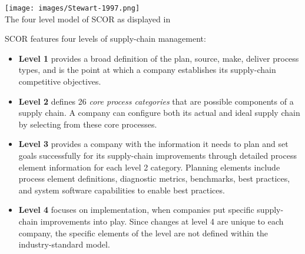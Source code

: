 \documentclass[11pt,a4paper]{article}
\begin{document}
\begin{center}
  \texttt{[image: images/Stewart-1997.png]}\\
  The four level model of SCOR as displayed in \cite{Stewart1997}
\end{center}

SCOR features four levels of supply-chain management:
\begin{itemize}
\item \textbf{Level 1} provides a broad definition of the plan, source, make,
  deliver process types, and is the point at which a company establishes its
  supply-chain competitive objectives.
\item \textbf{Level 2} defines 26 \emph{core process categories} that are
  possible components of a supply chain. A company can configure both its
  actual and ideal supply chain by selecting from these core processes.
\item \textbf{Level 3} provides a company with the information it needs to
  plan and set goals successfully for its supply-chain improvements through
  detailed process element information for each level 2 category. Planning
  elements include process element definitions, diagnostic metrics,
  benchmarks, best practices, and system software capabilities to enable best
  practices.
\item \textbf{Level 4} focuses on implementation, when companies put specific
  supply-chain improvements into play. Since changes at level 4 are unique to
  each company, the specific elements of the level are not defined within the
  industry-standard model.
\end{itemize}
\end{document}
